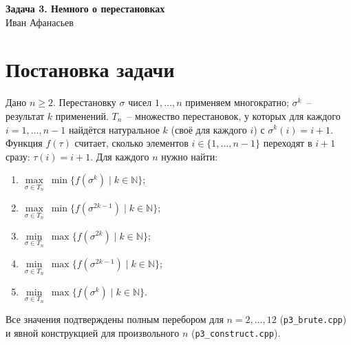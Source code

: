 \documentclass[12pt,a4paper]{article}
\begin{document}
\sloppy

\begin{center}
  {\LARGE\bfseries Задача 3. Немного о перестановках}\\[4pt]
  {\large Иван Афанасьев}\\[2pt]
\end{center}

\vspace{6pt}
\begin{center}
\end{center}
\vspace{10pt}

\section{Постановка задачи}

Дано $n\ge2$. Перестановку $\sigma$ чисел $1,\dots,n$ применяем многократно;
$\sigma^{k}$~-- результат $k$ применений. $T_n$~-- множество перестановок,
у которых для каждого $i=1,\dots,n-1$ найдётся натуральное $k$ (своё для
каждого $i$) с $\sigma^{k}(i)=i+1$. Функция $f(\tau)$ считает, сколько
элементов $i\in\{1,\dots,n-1\}$ переходят в $i+1$ сразу: $\tau(i)=i+1$.
Для каждого $n$ нужно найти:
\begin{enumerate}[label=\arabic*.]
  \item $\max\limits_{\sigma\in T_n}\ \min\{f(\sigma^{k})\mid k\in\mathbb N\}$;
  \item $\max\limits_{\sigma\in T_n}\ \min\{f(\sigma^{2k-1})\mid k\in\mathbb N\}$;
  \item $\min\limits_{\sigma\in T_n}\ \max\{f(\sigma^{2k})\mid k\in\mathbb N\}$;
  \item $\min\limits_{\sigma\in T_n}\ \max\{f(\sigma^{2k-1})\mid k\in\mathbb N\}$;
  \item $\min\limits_{\sigma\in T_n}\ \max\{f(\sigma^{k})\mid k\in\mathbb N\}$.
\end{enumerate}

Все значения подтверждены полным перебором для $n=2,\dots,12$
(\texttt{p3\_brute.cpp}) и явной конструкцией для произвольного $n$
(\texttt{p3\_construct.cpp}).
\end{document}
